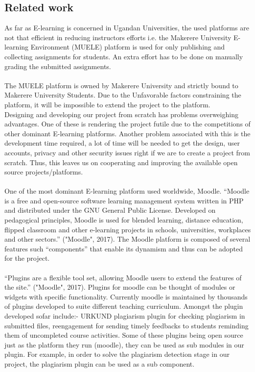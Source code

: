 \documentclass[12pt]{article}
\begin{document}
	\subsection{Related work}
		As far as E-learning is concerned in Ugandan Universities, the used platforms are not that efficient in reducing 				instructors efforts i.e. the Makerere University E-learning Environment (MUELE) platform is used for only publishing and 				collecting assignments for students. An extra effort has to be done on manually grading the submitted assignments.\\ \\
		The MUELE platform is owned by Makerere University and strictly bound to Makerere University Students.  Due to the 			Unfavorable factors constraining the platform, it will be impossible to extend the project to the platform.\\
		Designing and developing our project from scratch has problems overweighing advantages. One of these is rendering 			the project futile due to the competitions of other dominant E-learning platforms. Another problem associated with this is the 			development time required, a lot of time will be needed to get the design, user accounts, privacy and other security issues 			right if we are to create a project from scratch. Thus, this leaves us on cooperating and improving the available open source 			projects/platforms.\\ \\
		One of the most dominant E-learning platform used worldwide, Moodle. “Moodle is a free and open-source software 			learning management system written in PHP and distributed under the GNU General Public License. Developed on pedagogical 			principles, Moodle is used for blended learning, distance education, flipped classroom and other e-learning projects in schools, 			universities, workplaces and other sectors.” ("Moodle", 2017). The Moodle platform is composed of several features such 			“components” that enable its dynamism and thus can be adopted for the project. \\ \\
		“Plugins are a flexible tool set, allowing Moodle users to extend the features of the site.” ("Moodle", 2017). Plugins for 			moodle can be thought of modules or widgets with specific functionality. Currently moodle is maintained by  thousands of 			plugins developed to suite different teaching curriculum. Amongst the plugin developed sofar include:- URKUND plagiarism 			plugin for checking plagiarism in submitted files, reengagement for sending timely feedbacks to students reminding them of 			uncompleted course activities. Some of these plugins being open source just as the platform they run (moodle), they can be 			used as sub modules in our plugin. For example, in order to solve the plagiarism detection stage in our project, the plagiarism 			plugin can be used as a sub component. \\ \\
\end{document}
